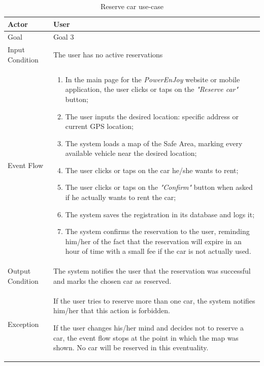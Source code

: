 \begin{table}[H]
\begin{center}
\begin{tabular}{p{} | p{}}
\hline
Actor & User\\
\hline
Goal & Goal 3\\
\hline
Input Condition & The user has no active reservations\\
\hline
Event Flow & 
\begin{enumerate}
\item In the main page for the \emph{PowerEnJoy} website or mobile application, the user clicks or taps on the \emph{"Reserve car"} button;
\item The user inputs the desired location: specific address or current GPS location;
\item The system loads a map of the Safe Area, marking every available vehicle near the desired location;
\item The user clicks or taps on the car he/she wants to rent;
\item The user clicks or taps on the \emph{"Confirm"} button when asked if he actually wants to rent the car;
\item The system saves the registration in its database and logs it;
\item The system confirms the reservation to the user, reminding him/her of the fact that the reservation will expire in an hour of time with a small fee if the car is not actually used.
\end{enumerate} \\
\hline
Output Condition & The system notifies the user that the reservation was successful and marks the chosen car as reserved.\\
\hline
Exception & If the user tries to reserve more than one car, the system notifies him/her that this action is forbidden.

If the user changes his/her mind and decides not to reserve a car, the event flow stops at the point in which the map was shown. No car will be reserved in this eventuality.\\
\hline
\end{tabular}
\end{center}
\caption{Reserve car use-case}
\label{reserve_car_uc}
\end{table}

